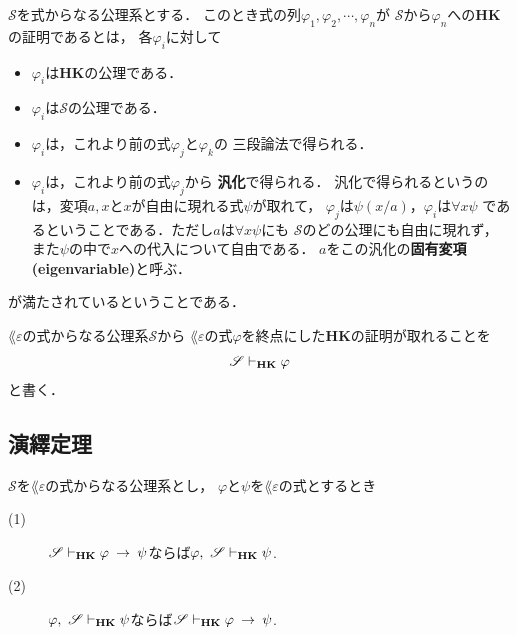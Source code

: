 	\begin{screen}
		\begin{metadfn}[{\bf HK}における証明]
			$\mathscr{S}$を式からなる公理系とする．
			このとき式の列$\varphi_{1},\varphi_{2},\cdots,\varphi_{n}$が
			$\mathscr{S}$から$\varphi_{n}$への{\bf HK}の証明であるとは，
			各$\varphi_{i}$に対して
			\begin{itemize}
				\item $\varphi_{i}$は{\bf HK}の公理である．
				\item $\varphi_{i}$は$\mathscr{S}$の公理である．
				\item $\varphi_{i}$は，これより前の式$\varphi_{j}$と$\varphi_{k}$の
					三段論法で得られる．
				\item $\varphi_{i}$は，これより前の式$\varphi_{j}$から
					{\bf 汎化}で得られる．
					汎化で得られるというのは，変項$a,x$と$x$が自由に現れる式$\psi$が取れて，
					$\varphi_{j}$は$\psi(x/a)$，$\varphi_{i}$は$\forall x \psi$
					であるということである．ただし$a$は$\forall x \psi$にも
					$\mathscr{S}$のどの公理にも自由に現れず，
					また$\psi$の中で$x$への代入について自由である．
					$a$をこの汎化の{\bf 固有変項}
					{\bf (eigenvariable)}と呼ぶ．
			\end{itemize}
			が満たされているということである．
		\end{metadfn}
	\end{screen}
	
	$\lang{\varepsilon}$の式からなる公理系$\mathscr{S}$から
	$\lang{\varepsilon}$の式$\varphi$を終点にした{\bf HK}の証明が取れることを
	\begin{align}
		\mathscr{S} \vdash_{{\scriptsize \mbox{{\bf HK}}}} \varphi
	\end{align}
	と書く．
	
\subsection{演繹定理}
	\begin{screen}
		\begin{metathm}[{\bf HK}の演繹定理]
		\label{metathm:deduction_theorem_of_HK}
			$\mathscr{S}$を$\lang{\varepsilon}$の式からなる公理系とし，
			$\varphi$と$\psi$を$\lang{\varepsilon}$の式とするとき
			\begin{description}
				\item[(1)] $\mathscr{S} \vdash_{{\scriptsize \mbox{{\bf HK}}}} \varphi \hspace{0.25em}\rightarrow\hspace{0.25em} \psi$ならば$\varphi,\ \mathscr{S} \provable{\mbox{{\bf HK}}} \psi$.
				\item[(2)] $\varphi,\ \mathscr{S} \provable{\mbox{{\bf HK}}} \psi$ならば$\mathscr{S} \vdash_{{\scriptsize \mbox{{\bf HK}}}} \varphi \hspace{0.25em}\rightarrow\hspace{0.25em} \psi$.
			\end{description}
		\end{metathm}
	\end{screen}
	
